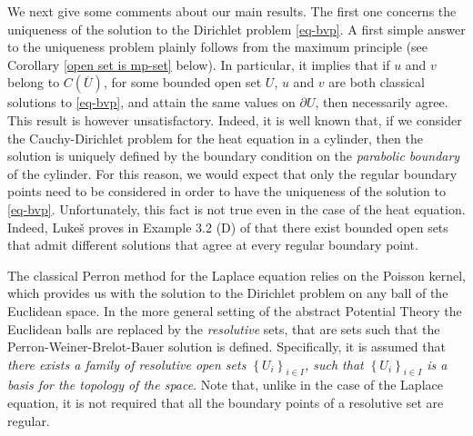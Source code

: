 \documentclass{amsart}
\numberwithin{equation}{section}
\begin{document}
{We next give some comments about our main results. The first one concerns the uniqueness of the solution to the Dirichlet problem \eqref{eq-bvp}. A first simple answer to the uniqueness problem plainly follows from the maximum principle (see Corollary \ref{open set is mp-set} below). In particular, it implies that if $u$ and $v$ belong to $C(\overline U)$, for some bounded open set $U$, $u$ and $v$ are both classical solutions to \eqref{eq-bvp}, and attain the same values on $\partial U$, then necessarily agree. This result is however unsatisfactory. Indeed, it is well known that, if we consider the Cauchy-Dirichlet problem for the heat equation in a cylinder, then the solution is uniquely defined by the boundary condition on the \textit{parabolic boundary} of the cylinder. For this reason, we would expect that only the regular boundary points need to be considered in order to have the uniqueness of the solution to \eqref{eq-bvp}. Unfortunately, this fact is not true even in the case of the heat equation. Indeed, Luke\v{s} proves in Example 3.2 (D) of \cite{Luk74} that there exist bounded open sets that admit different solutions that agree at every regular boundary point.

The classical Perron method for the Laplace equation relies on the Poisson kernel, which provides us with the solution to the Dirichlet problem on any ball of the Euclidean space. In the more general setting of the abstract Potential Theory the Euclidean balls are replaced by the \textit{resolutive} sets, that are sets such that the {{Perron-Weiner-Brelot-Bauer}} solution is defined. Specifically, it is assumed that {\it there exists a family of resolutive open sets $\left\{ U_i \right\}_{i \in I}$, such that $\left\{ U_i \right\}_{i \in I}$ is a basis for the topology of the space}. Note that, unlike in the case of the Laplace equation, it is not required that all the boundary points of a resolutive set are regular.

}
\end{document}
